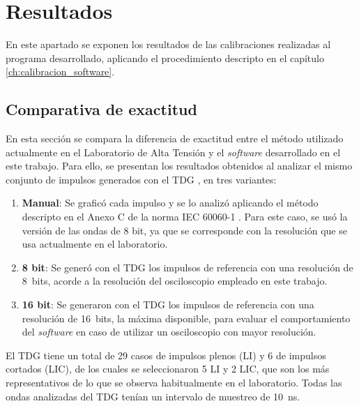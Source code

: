 \newpage
\chapter*{Resultados}
\label{ch:resultados}
\vspace{3\baselineskip}

\setcounter{table}{0} \renewcommand{\thetable}{R.\arabic{table}} %

En este apartado se exponen los resultados de las calibraciones realizadas al programa desarrollado, aplicando el procedimiento descripto en el capítulo \ref{ch:calibracion_software}.

\section*{Comparativa de exactitud}
\label{sec:comparativa_exactitud}
\vspace{3\baselineskip}

En esta sección se compara la diferencia de exactitud entre el método utilizado actualmente en el Laboratorio de Alta Tensión y el \emph{software} desarrollado en el este trabajo. Para ello, se presentan los resultados obtenidos al analizar el mismo conjunto de impulsos generados con el TDG \cite{iec61083_2}, en tres variantes:

\begin{enumerate}
    \item \textbf{Manual}: Se graficó cada impulso y se lo analizó aplicando el método descripto en el Anexo C de la norma IEC 60060-1 \cite{iec60060_1}. Para este caso, se usó la versión de las ondas de 8 bit, ya que se corresponde con la resolución que se usa actualmente en el laboratorio.
    \item \textbf{8 bit}: Se generó con el TDG los impulsos de referencia con una resolución de \qty{8}{bits}, acorde a la resolución del osciloscopio \cite{gds1000au_UserManual} empleado en este trabajo.
    \item \textbf{16 bit}: Se generaron con el TDG los impulsos de referencia con una resolución de \qty{16}{bits}, la máxima disponible, para evaluar el comportamiento del \emph{software} en caso de utilizar un osciloscopio con mayor resolución.
\end{enumerate}

El TDG tiene un total de \num{29} casos de impulsos plenos (LI) y \num{6} de impulsos cortados (LIC), de los cuales se seleccionaron \num{5} LI y \num{2} LIC, que son los más representativos de lo que se observa habitualmente en el laboratorio.
Todas las ondas analizadas del TDG tenían un intervalo de muestreo de \qty{10}{\nano\second}.

